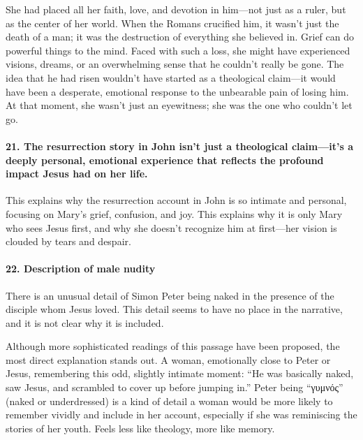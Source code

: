 She had placed all her faith, love, and devotion in him---not just as a ruler, but as the center of her world.
When the Romans crucified him, it wasn't just the death of a man; it was the destruction of everything she believed in.
Grief can do powerful things to the mind.
Faced with such a loss, she might have experienced visions, dreams, or an overwhelming sense that he couldn't really be gone.
The idea that he had risen wouldn't have started as a theological claim---it would have been a desperate, emotional response to the unbearable pain of losing him.
At that moment, she wasn't just an eyewitness; she was the one who couldn't let go.

\paragraph{21.
The resurrection story in John isn't just a theological claim---it's a deeply personal, emotional experience that reflects the profound impact Jesus had on her life.}\label{par:the-resurrection-story-in-john-isnt-just-a-theological-claimits-a-deeply-personal-emotional-experience-that-reflects-the-profound-impact-jesus-had-on-her-life.}

This explains why the resurrection account in John is so intimate and personal, focusing on Mary's grief, confusion, and joy.
This explains why it is only Mary who sees Jesus first, and why she doesn't recognize him at first---her vision is clouded by tears and despair.

\paragraph{22.
Description of male nudity}\label{par:description-of-male-nudity}

There is an unusual detail of Simon Peter being naked in the presence of the disciple whom Jesus loved.
This detail seems to have no place in the narrative, and it is not clear why it is included.

Although more sophisticated readings of this passage have been proposed, the most direct explanation stands out.
A woman, emotionally close to Peter or Jesus, remembering this odd, slightly intimate moment: ``He was basically naked, saw Jesus, and scrambled to cover up before jumping in.'' Peter being ``γυμνός'' (naked or underdressed) is a kind of detail a woman would be more likely to remember vividly and include in her account, especially if she was reminiscing the stories of her youth.
Feels less like theology, more like memory.


